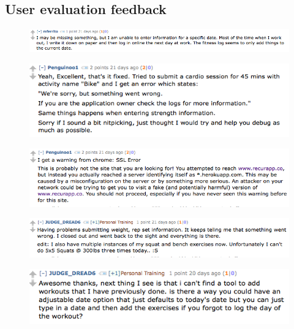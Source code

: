 \documentclass[titlepage,a4paper,11pt,oneside]{book} %
\begin{document}
\setcounter{figure}{0}
\begin{appendices}
\appendixpage
\noappendicestocpagenum
\addappheadtotoc

\chapter{User evaluation feedback}

\begin{figure}[!ht]
\centering
\includegraphics[scale=0.5]{chapters/apendix/user1}
\end{figure}

\begin{figure}[!ht]
\centering
\includegraphics[scale=0.6]{chapters/apendix/user2}
\end{figure}

\begin{figure}[!ht]
\centering
\includegraphics[scale=0.6]{chapters/apendix/user3}
\end{figure}

\begin{figure}[!ht]
\centering
\includegraphics[scale=0.6]{chapters/apendix/user4}
\end{figure}

\begin{figure}[!ht]
\centering
\includegraphics[scale=0.6]{chapters/apendix/user5}
\end{figure}


\end{appendices}
\end{document}

